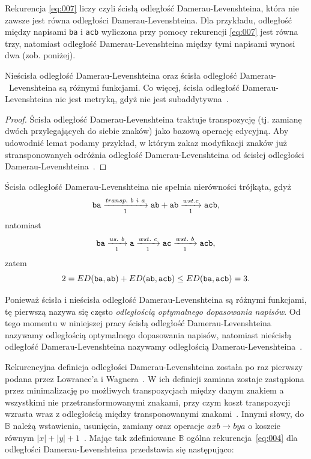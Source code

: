 \documentclass{praca1}
\begin{document}
Rekurencja \eqref{eq:007} liczy czyli ścisłą odległość Damerau-Levenshteina, która nie zawsze jest równa odległości Damerau-Levenshteina. Dla przykładu, odległość między napisami \verb|ba| i \verb|acb| wyliczona przy pomocy rekurencji \eqref{eq:007} jest równa trzy, natomiast odległość Damerau-Levenshteina między tymi napisami wynosi dwa (zob. poniżej).

\begin{lemma}
Nieścisła odległość Damerau-Levenshteina oraz ścisła odległość Damerau-~Levenshteina są różnymi funkcjami. Co więcej, ścisła odległość Damerau-Levenshteina nie jest metryką, gdyż nie jest subaddytywna~\cite{Boytsov2011:indexingmethods}.
\end{lemma}

\begin{proof}
Ścisła odległość Damerau-Levenshteina traktuje transpozycję (tj. zamianę dwóch przylegających do siebie znaków) jako bazową operację edycyjną. Aby udowodnić lemat podamy przykład, w którym zakaz modyfikacji znaków już stransponowanych odróżnia odległość Damerau-Levenshteina od ścisłej odległości Damerau-Levenshteina~\cite{Boytsov2011:indexingmethods}.
\end{proof}

Ścisła odległość Damerau-Levenshteina nie spełnia nierówności trójkąta, gdyż
$$
\verb|ba|  \xrightarrow[1]{transp.\ b\ i \ a} \verb|ab| + \verb|ab| \xrightarrow[1]{wst. c} \verb|acb|,
$$
natomiast
$$
\verb|ba|  \xrightarrow[1]{us.\ b} \verb|a| \xrightarrow[1]{wst.\ c} \verb|ac| \xrightarrow[1]{wst.\ b} \verb|acb|,
$$
zatem
$$
2 = ED(\verb|ba|, \verb|ab|) + ED(\verb|ab|, \verb|acb|) \leq ED(\verb|ba|, \verb|acb|) = 3.
$$

Ponieważ ścisła i nieścisła odległość Damerau-Levenshteina są różnymi funkcjami, tę pierwszą nazywa się często \emph{odległością optymalnego dopasowania napisów}. Od tego momentu w niniejszej pracy ścisłą odległość Damerau-Levenshteina nazywamy odległością optymalnego dopasowania napisów, natomiast nieścisłą odległość Damerau-Levenshteina nazywamy odległością Damerau-Levenshteina~\cite{Loo2014:stringdist}.

Rekurencyjna definicja odległości Damerau-Levenshteina została po raz pierwszy podana przez Lowrance'a i Wagnera~\cite{Wagner1975:extensionstring}. W ich definicji zamiana zostaje zastąpiona przez minimalizację po możliwych transpozycjach między danym znakiem a wszystkimi nie przetransformowanymi znakami, przy czym koszt transpozycji wzrasta wraz z odległością między transponowanymi znakami~\cite{Loo2014:stringdist}. Innymi słowy, do $\mathbb{B}$ należą wstawienia, usunięcia, zamiany oraz operacje $axb \rightarrow bya$ o koszcie równym $|x| + |y| + 1$~\cite{Boytsov2011:indexingmethods}. Mając tak zdefiniowane $\mathbb{B}$ ogólna rekurencja~\eqref{eq:004} dla odległości Damerau-Levenshteina przedstawia się następująco: 
\end{document}
